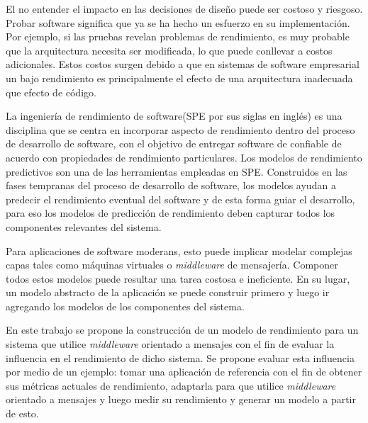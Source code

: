 \documentclass[11pt, twoside]{report}
\begin{document}
El no entender el impacto en las decisiones de diseño puede ser costoso y riesgoso. Probar software significa que ya se ha hecho un esfuerzo en su implementación. Por ejemplo, si las pruebas revelan problemas de rendimiento, es muy probable que la arquitectura necesita ser modificada, lo que puede conllevar a costos adicionales. Estos costos surgen debido a que en sistemas de software empresarial un bajo rendimiento es principalmente el efecto de una arquitectura inadecuada que efecto de código.

La ingeniería de rendimiento de software(SPE por sus siglas en inglés) es una disciplina que se centra en incorporar aspecto de rendimiento dentro del proceso de desarrollo de software, con el objetivo de entregar software de confiable de acuerdo con propiedades de rendimiento particulares. Los modelos de rendimiento predictivos son una de las herramientas empleadas en SPE. Construidos en las fases tempranas del proceso de desarrollo de software, los modelos ayudan a predecir el rendimiento eventual del software y de esta forma guiar el desarrollo, para eso los modelos de predicción de rendimiento deben capturar todos los componentes relevantes del sistema.

Para aplicaciones de software moderans, esto puede implicar modelar complejas capas tales como máquinas virtuales o \emph{middleware} de mensajería. Componer todos estos modelos puede resultar una tarea costosa e ineficiente. En su lugar, un modelo abstracto de la aplicación se puede construir primero y luego ir agregando los modelos de los componentes del sistema. 

En este trabajo se propone la construcción de un modelo de rendimiento para un sistema que utilice \emph{middleware} orientado a mensajes con el fin de evaluar la influencia en el rendimiento de dicho sistema. Se propone evaluar esta influencia por medio de un ejemplo: tomar una aplicación de referencia con el fin de obtener sus métricas actuales de rendimiento, adaptarla para que utilice \emph{middleware} orientado a mensajes y luego medir su rendimiento y generar un modelo a partir de esto. 
\end{document}
